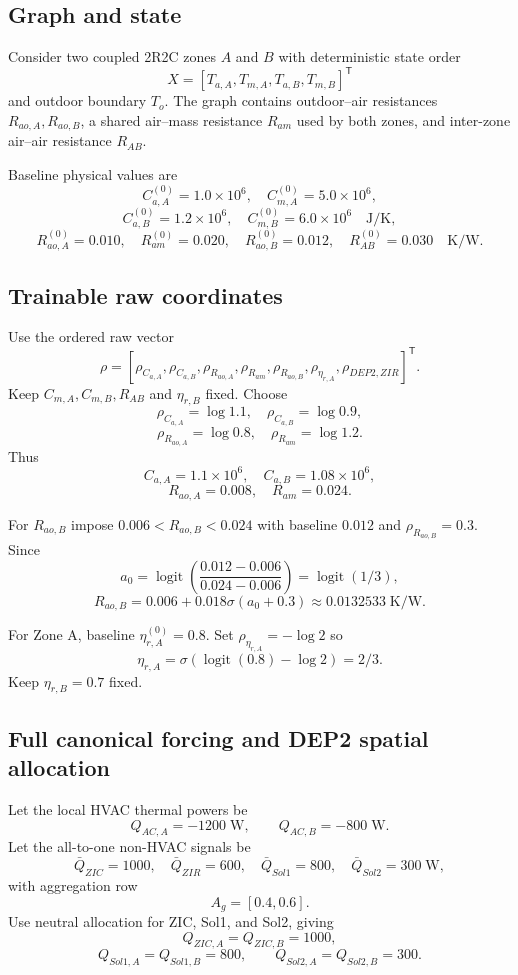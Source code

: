 \documentclass[11pt]{article}
\newcommand{\logit}{\operatorname{logit}}
\newcommand{\sigmoid}{\sigma}
\begin{document}
\subsection{Graph and state}
Consider two coupled 2R2C zones $A$ and $B$ with deterministic state order
\[
\boxed{X=[T_{a,A},T_{m,A},T_{a,B},T_{m,B}]^{\mathsf T}}
\]
and outdoor boundary $T_o$. The graph contains outdoor--air resistances
$R_{ao,A},R_{ao,B}$, a shared air--mass resistance $R_{am}$ used by both zones,
and inter-zone air--air resistance $R_{AB}$.

Baseline physical values are
\[
C_{a,A}^{(0)}=1.0\times10^6,\quad
C_{m,A}^{(0)}=5.0\times10^6,
\]
\[
C_{a,B}^{(0)}=1.2\times10^6,\quad
C_{m,B}^{(0)}=6.0\times10^6\quad\text{J/K},
\]
\[
R_{ao,A}^{(0)}=0.010,\quad
R_{am}^{(0)}=0.020,\quad
R_{ao,B}^{(0)}=0.012,\quad
R_{AB}^{(0)}=0.030\quad\text{K/W}.
\]

\subsection{Trainable raw coordinates}
Use the ordered raw vector
\[
\boxed{
\rho=
[\rho_{C_{a,A}},\rho_{C_{a,B}},\rho_{R_{ao,A}},
\rho_{R_{am}},\rho_{R_{ao,B}},\rho_{\eta_{r,A}},
\rho_{DEP2,ZIR}]^{\mathsf T}.
}
\]
Keep $C_{m,A},C_{m,B},R_{AB}$ and $\eta_{r,B}$ fixed.
Choose
\[
\rho_{C_{a,A}}=\log1.1,
\quad
\rho_{C_{a,B}}=\log0.9,
\]
\[
\rho_{R_{ao,A}}=\log0.8,
\quad
\rho_{R_{am}}=\log1.2.
\]
Thus
\[
C_{a,A}=1.1\times10^6,
\quad C_{a,B}=1.08\times10^6,
\]
\[
R_{ao,A}=0.008,
\quad R_{am}=0.024.
\]

For $R_{ao,B}$ impose $0.006<R_{ao,B}<0.024$ with baseline $0.012$ and
$\rho_{R_{ao,B}}=0.3$. Since
\[
a_0=\logit\left(\frac{0.012-0.006}{0.024-0.006}\right)=\logit(1/3),
\]
\[
\boxed{R_{ao,B}=0.006+0.018\sigmoid(a_0+0.3)\approx0.0132533\;\text{K/W}.}
\]

For Zone A, baseline $\eta_{r,A}^{(0)}=0.8$. Set
$\rho_{\eta_{r,A}}=-\log2$ so
\[
\eta_{r,A}=\sigmoid(\logit(0.8)-\log2)=\boxed{2/3}.
\]
Keep $\eta_{r,B}=0.7$ fixed.

\subsection{Full canonical forcing and DEP2 spatial allocation}
Let the local HVAC thermal powers be
\[
Q_{AC,A}=-1200\;\text{W},\qquad Q_{AC,B}=-800\;\text{W}.
\]
Let the all-to-one non-HVAC signals be
\[
\bar Q_{ZIC}=1000,\quad
\bar Q_{ZIR}=600,\quad
\bar Q_{Sol1}=800,\quad
\bar Q_{Sol2}=300\;\text{W},
\]
with aggregation row
\[
A_g=[0.4,0.6].
\]
Use neutral allocation for ZIC, Sol1, and Sol2, giving
\[
Q_{ZIC,A}=Q_{ZIC,B}=1000,
\]
\[
Q_{Sol1,A}=Q_{Sol1,B}=800,
\qquad
Q_{Sol2,A}=Q_{Sol2,B}=300.
\]
\end{document}
